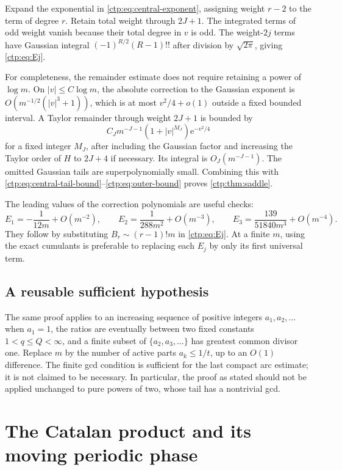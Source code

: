 \documentclass[11pt,a4paper]{article}
\numberwithin{equation}{section}
\theoremstyle{definition}
\theoremstyle{remark}
\newcommand{\e}{\mathrm e}
\begin{document}
Expand the exponential in \eqref{ctp:eq:central-exponent}, assigning weight
$r-2$ to the term of degree $r$. Retain total weight through $2J+1$.
The integrated terms of odd weight vanish because their total degree in
$v$ is odd. The weight-$2j$ terms have Gaussian integral
$(-1)^{R/2}(R-1)!!$ after division by $\sqrt{2\pi}$, giving
\eqref{ctp:eq:Ej}.

For completeness, the remainder estimate does not require retaining a
power of $\log m$. On $|v|\leq C\log m$, the absolute correction to the
Gaussian exponent is $O(m^{-1/2}(|v|^3+1))$, which is at most
$v^2/4+o(1)$ outside a fixed bounded interval. A Taylor remainder through
weight $2J+1$ is bounded by
\[
 C_Jm^{-J-1}(1+|v|^{M_J})\e^{-v^2/4}
\]
for a fixed integer $M_J$, after including the Gaussian factor and
increasing the Taylor order of $H$ to $2J+4$ if necessary. Its integral is
$O_J(m^{-J-1})$. The omitted Gaussian tails are superpolynomially small.
Combining this with \eqref{ctp:eq:central-tail-bound}--\eqref{ctp:eq:outer-bound}
proves \cref{ctp:thm:saddle}.

The leading values of the correction polynomials are useful checks:
\begin{equation}\label{ctp:eq:E-universal}
 E_1=-\frac1{12m}+O(m^{-2}),\qquad
 E_2=\frac1{288m^2}+O(m^{-3}),\qquad
 E_3=\frac{139}{51840m^3}+O(m^{-4}).
\end{equation}
They follow by substituting $B_r\sim(r-1)!m$ in \eqref{ctp:eq:Ej}.
At a finite $m$, using the exact cumulants is preferable to replacing each
$E_j$ by only its first universal term.

\subsection{A reusable sufficient hypothesis}
The same proof applies to an increasing sequence of positive integers
$a_1,a_2,\ldots$ when $a_1=1$, the ratios are eventually between two fixed
constants $1<q\leq Q<\infty$, and a finite subset of
$\{a_2,a_3,\ldots\}$ has greatest common divisor one. Replace $m$ by the
number of active parts $a_k\leq1/t$, up to an $O(1)$ difference. The finite
gcd condition is sufficient for the last compact arc estimate; it is not
claimed to be necessary. In particular, the proof as stated should not be
applied unchanged to pure powers of two, whose tail has a nontrivial gcd.

\section{The Catalan product and its moving periodic phase}
\label{ctp:sec:phase}
\end{document}
